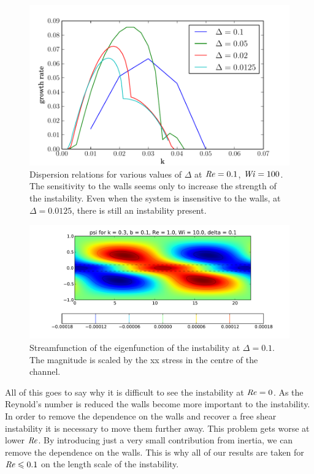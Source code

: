 \documentclass{jfm}
\newcommand\Wi{\mbox{\textit{Wi}}}
\newcommand\Rey{\mbox{\textit{Re}}}  %
\begin{document}
\begin{figure}
    \centering
    \includegraphics[width=\textwidth]{KH_vary_delta}
    \caption{Dispersion relations for various values of $\Delta$ at $\Rey = 0.1$, $\Wi = 100$. The sensitivity to the walls seems only to increase the strength of the instability. Even when the system is insensitive to the walls, at $\Delta= 0.0125$, there is still an instability present.}
    \label{fig:walls_dependence}
\end{figure}

\begin{figure}
    \centering
    \includegraphics[width=\textwidth]{psi_high_delta}
    \caption{Streamfunction of the eigenfunction of the instability at $\Delta = 0.1$. The magnitude is scaled by the xx stress in the centre of the channel.}
    \label{fig:psi_high_delta}
\end{figure}

All of this goes to say why it is difficult to see the instability at $\Rey = 0$. As the Reynold's number is reduced the walls become more important to the instability. In order to remove the dependence on the walls and recover a free shear instability it is necessary to move them further away. This problem gets worse at lower $\Rey$. By introducing just a very small contribution from inertia, we can remove the dependence on the walls. This is why all of our results are taken for $\Rey \leq 0.1$ on the length scale of the instability.
\end{document}
